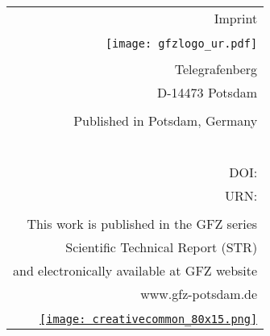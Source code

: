 {{		%
		\begin{flushright}\vfill
			\begin{tabular}{r}
				{\normalsize Imprint} \\
				\\
				\texttt{[image: gfzlogo\_ur.pdf]} \\
				\\
				Telegrafenberg \\
				D-14473 Potsdam  \\ 
				\\
				Published in Potsdam, Germany \\
				\rstPublicationMonth\ \rstPublicationYear \\
				\rstIssn \\
				DOI: \href{\rstDoiUrl}{\rstDoiStr} \\
				URN: \rstUrn \\
				\\
				This work is published in the GFZ series \\
				Scientific Technical Report (STR) \\
				and electronically available at GFZ website \\
				www.gfz-potsdam.de \\
				\\
				\href{http://creativecommons.org/licenses/by-sa/4.0/}{\texttt{[image: creativecommon\_80x15.png]}}
			\end{tabular}
		\end{flushright}
	}
	\thispagestyle{empty}
	\clearpage

	\thispagestyle{empty}
	\clearpage
}
\makeatother